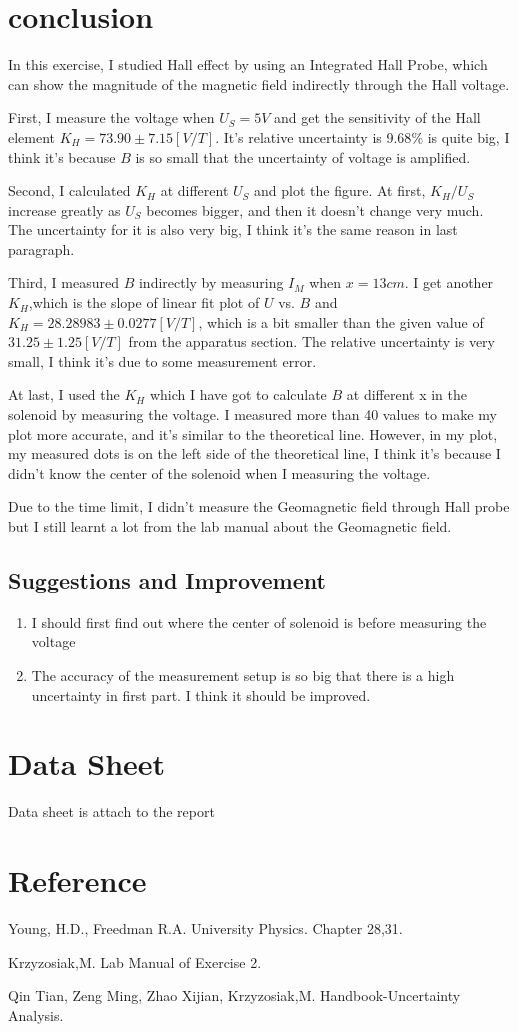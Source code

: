 \documentclass[12pt]{article}
\begin{document}
\section{conclusion}
In this exercise, I studied Hall effect by using an Integrated Hall Probe, which can show the magnitude of the magnetic field indirectly through the Hall voltage. 
\par First, I measure the voltage when $U_S=5V$ and get the sensitivity of the Hall element $K_H=73.90\pm7.15[V/T]$. It's relative uncertainty is 9.68$\%$ is quite big, I think it's because $B$ is so small that the uncertainty of voltage is amplified.
\par Second, I calculated $K_H$ at different $U_S$ and plot the figure. At first, $K_H/U_S$ increase greatly as $U_S$ becomes bigger, and then it doesn't change very much. The uncertainty for it is also very big, I think it's the same reason in last paragraph.
\par Third, I measured $B$ indirectly by measuring $I_M$ when $x=13cm$. I get another $K_H$,which is the slope of linear fit plot of $U$ vs. $B$ and $K_H=28.28983\pm0.0277[V/T]$, which is a bit smaller than the given value of $31.25\pm1.25[V/T]$ from the apparatus section. The relative uncertainty is very small, I think it's due to some measurement error. 
\par At last, I used the $K_H$ which I have got to calculate $B$ at different x in the solenoid by measuring the voltage. I measured more than 40 values to make my plot more accurate, and it's similar to the theoretical line. However, in my plot, my measured dots is on the left side of the theoretical line, I think it's because I didn't know the center of the solenoid when I measuring the voltage.
\par Due to the time limit, I didn't measure the Geomagnetic field through Hall probe but I still learnt a lot from the lab manual about the Geomagnetic field.
\subsection{Suggestions and Improvement}
\begin{enumerate}
\item I should first find out where the center of solenoid is before measuring the voltage
\item The accuracy of the measurement setup is so big that there is a high uncertainty in first part. I think it should be improved.
\end{enumerate}

\section{Data Sheet}
Data sheet is attach to the report
\section{Reference}
\par Young, H.D., Freedman R.A. University Physics. Chapter 28,31.
\par Krzyzosiak,M. Lab Manual of Exercise 2.
\par Qin Tian, Zeng Ming, Zhao Xijian, Krzyzosiak,M. Handbook-Uncertainty Analysis.
\end{document}
